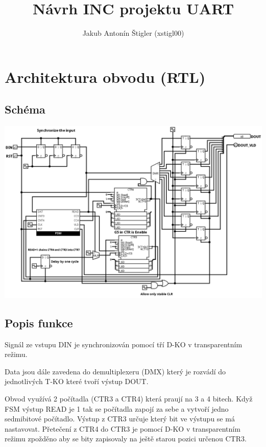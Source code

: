 \documentclass{article}
\title{Návrh INC projektu UART}
\author{Jakub Antonín Štigler (xstigl00)}
\begin{document}
\maketitle


\section{Architektura obvodu (RTL)}

\subsection{Schéma}
\includegraphics*[scale=0.4]{assets/RTL.png}

\subsection{Popis funkce}

Signál ze vstupu DIN je synchronizován pomocí tří D-KO v transparentním režimu.

Data jsou dále zavedena do demultiplexeru (DMX) který je rozvádí do
jednotlivých T-KO které tvoří výstup DOUT.

Obvod využívá 2 počítadla (CTR3 a CTR4) která praují na 3 a 4 bitech.
Když FSM výstup READ je 1 tak se počítadla zapojí za sebe a vytvoří jedno
sedmibitové počítadlo. Výstup z CTR3 určuje který bit ve výstupu se má
nastavovat. Přetečení z CTR4 do CTR3 je pomocí D-KO v transparentním režimu
zpožděno aby se bity zapisovaly na ještě starou pozici určenou CTR3.
\end{document}
